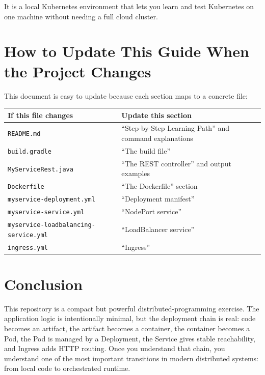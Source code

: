 \documentclass[a4paper,11pt]{article}
\begin{document}
It is a local Kubernetes environment that lets you learn and test Kubernetes on one machine without needing a full cloud cluster.

\section{How to Update This Guide When the Project Changes}

This document is easy to update because each section maps to a concrete file:

\begin{center}
\begin{tabularx}{\textwidth}{@{}lY@{}}
\toprule
\textbf{If this file changes} & \textbf{Update this section} \\
\midrule
\texttt{README.md} & ``Step-by-Step Learning Path'' and command explanations \\
\texttt{build.gradle} & ``The build file'' \\
\texttt{MyServiceRest.java} & ``The REST controller'' and output examples \\
\texttt{Dockerfile} & ``The Dockerfile'' section \\
\texttt{myservice-deployment.yml} & ``Deployment manifest'' \\
\texttt{myservice-service.yml} & ``NodePort service'' \\
\texttt{myservice-loadbalancing-service.yml} & ``LoadBalancer service'' \\
\texttt{ingress.yml} & ``Ingress'' \\
\bottomrule
\end{tabularx}
\end{center}

\section{Conclusion}

This repository is a compact but powerful distributed-programming exercise. The application logic is intentionally minimal, but the deployment chain is real: code becomes an artifact, the artifact becomes a container, the container becomes a Pod, the Pod is managed by a Deployment, the Service gives stable reachability, and Ingress adds HTTP routing. Once you understand that chain, you understand one of the most important transitions in modern distributed systems: from local code to orchestrated runtime.
\end{document}

